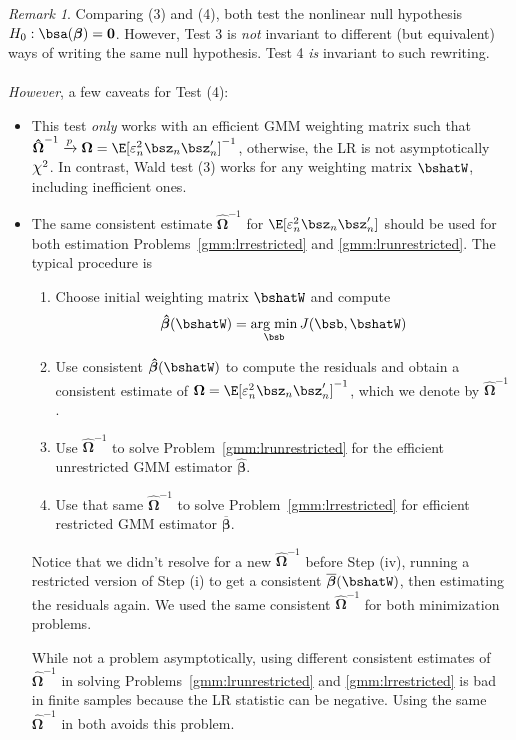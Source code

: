 \documentclass[12pt]{article}
\theoremstyle{plain}
\theoremstyle{definition}
\theoremstyle{remark}
\newtheorem*{rmk}{Remark}
\newcommand*{\Chi}{\mbox{\large$\chi$}} %
\newcommand{\bsbeta}{\boldsymbol{\beta}}
\newcommand{\bsOmega}{\boldsymbol{\Omega}}
\newcommand{\bshatbeta}{\boldsymbol{\hat{\beta}}}
\newcommand{\bsbarbeta}{\boldsymbol{\overline{\beta}}}
\newcommand{\bshatOmega}{\boldsymbol{\hat{\Omega}}}
\renewcommand{\bso}{\boldsymbol{0}}
\DeclareMathOperator*{\argmin}{arg\;min}
\newcommand{\pto}{\xrightarrow{p}}
\begin{document}
\begin{rmk}
Comparing (3) and (4), both test the nonlinear null hypothesis
$H_0:\bsa(\bsbeta)=\bso$. However, Test 3 is \emph{not} invariant to
different (but equivalent) ways of writing the same null hypothesis.
Test 4 \emph{is} invariant to such rewriting.
\\
\\
\emph{However}, a few caveats for Test (4):
\begin{itemize}
  \item This test \emph{only} works with an efficient GMM weighting
    matrix such that
    $\bshatOmega^{-1}\pto \bsOmega=\E[\varepsilon_n^2\bsz_n\bsz_n']^{-1}$, otherwise,
    the LR is not asymptotically $\Chi^2$. In contrast, Wald test (3)
    works for any weighting matrix $\bshatW$, including inefficient
    ones.

  \item The same consistent estimate $\bshatOmega^{-1}$ for
    $\E[\varepsilon_n^2\bsz_n\bsz_n']$ should be used for both
    estimation Problems~\ref{gmm:lrrestricted} and
    \ref{gmm:lrunrestricted}. The typical procedure is
    \begin{enumerate}[label=(\roman*)]
      \item
        Choose initial weighting matrix $\bshatW$ and compute
        \begin{align*}
          \bshatbeta(\bshatW) = \argmin_{\bsb} J(\bsb,\bshatW)
        \end{align*}

      \item Use consistent $\bshatbeta(\bshatW)$ to compute the
        residuals and obtain a consistent estimate of
        $\bsOmega=\E[\varepsilon_n^2\bsz_n\bsz_n']^{-1}$, which we denote by
        $\bshatOmega^{-1}$.

      \item Use $\bshatOmega^{-1}$ to solve
        Problem~\ref{gmm:lrunrestricted} for the efficient unrestricted
        GMM estimator $\bshatbeta$.

      \item Use that same $\bshatOmega^{-1}$ to solve
        Problem~\ref{gmm:lrrestricted} for efficient restricted
        GMM estimator $\bsbarbeta$.
    \end{enumerate}
    Notice that we didn't resolve for a new $\bshatOmega^{-1}$ before Step
    (iv), running a restricted version of Step (i) to get a consistent
    $\bsbarbeta(\bshatW)$, then estimating the residuals again. We used
    the same consistent $\bshatOmega^{-1}$ for both minimization problems.

    While not a problem asymptotically, using different consistent
    estimates of $\bshatOmega^{-1}$ in solving
    Problems~\ref{gmm:lrunrestricted} and \ref{gmm:lrrestricted} is bad
    in finite samples because the LR statistic can be negative. Using
    the same $\bshatOmega^{-1}$ in both avoids this problem.
\end{itemize}
\end{rmk}
\end{document}
